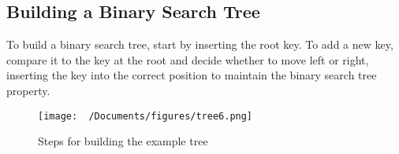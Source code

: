 \documentclass{report}
\begin{document}
\subsection*{Building a Binary Search Tree}

To build a binary search tree, start by inserting the root key. To add a new key, compare it to the key at the root and decide whether to move left or right, inserting the key into the correct position to maintain the binary search tree property.

\begin{figure}[ht]
    \centering
    \texttt{[image: ~/Documents/figures/tree6.png]}
    \caption{Steps for building the example tree}
\end{figure}
\end{document}
